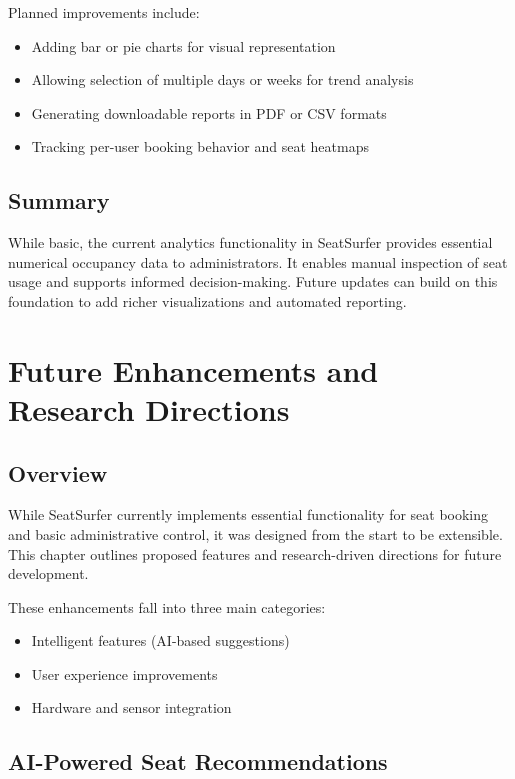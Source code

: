\documentclass[12pt,a4paper]{report}
\begin{document}
Planned improvements include:
\begin{itemize}
    \item Adding bar or pie charts for visual representation
    \item Allowing selection of multiple days or weeks for trend analysis
    \item Generating downloadable reports in PDF or CSV formats
    \item Tracking per-user booking behavior and seat heatmaps
\end{itemize}

\section{Summary}

While basic, the current analytics functionality in SeatSurfer provides essential numerical occupancy data to administrators. It enables manual inspection of seat usage and supports informed decision-making. Future updates can build on this foundation to add richer visualizations and automated reporting.

\newpage

\chapter{Future Enhancements and Research Directions}

\section{Overview}

While SeatSurfer currently implements essential functionality for seat booking and basic administrative control, it was designed from the start to be extensible. This chapter outlines proposed features and research-driven directions for future development.

These enhancements fall into three main categories:
\begin{itemize}
    \item Intelligent features (AI-based suggestions)
    \item User experience improvements
    \item Hardware and sensor integration
\end{itemize}

\section{AI-Powered Seat Recommendations}
\end{document}
